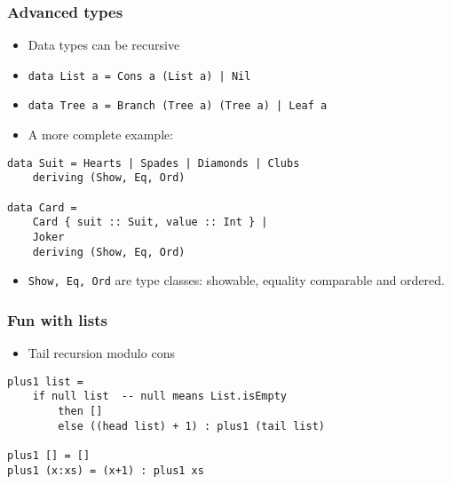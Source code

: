 \documentclass{beamer}
\begin{document}
\begin{frame}[fragile]
\frametitle{Advanced types}

\begin{itemize}
\item Data types can be recursive
\item \verb+data List a = Cons a (List a) | Nil+
\item \verb+data Tree a = Branch (Tree a) (Tree a) | Leaf a+
\item A more complete example:
\end{itemize}

\begin{verbatim}
data Suit = Hearts | Spades | Diamonds | Clubs 
    deriving (Show, Eq, Ord)

data Card =
    Card { suit :: Suit, value :: Int } |
    Joker
    deriving (Show, Eq, Ord)
\end{verbatim}

\begin{itemize}
\item \verb+Show, Eq, Ord+ are type classes: showable, equality comparable and ordered.
\end{itemize}

\end{frame}


\begin{frame}[fragile]
\frametitle{Fun with lists}

\begin{itemize}
\item Tail recursion modulo cons
\end{itemize}

\begin{verbatim}
plus1 list =
    if null list  -- null means List.isEmpty
        then []
        else ((head list) + 1) : plus1 (tail list)

plus1 [] = []
plus1 (x:xs) = (x+1) : plus1 xs
\end{verbatim}


\begin{verbatim}
\end{verbatim}

\end{frame}
\end{document}
